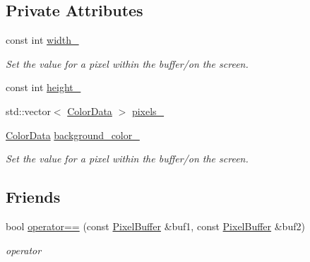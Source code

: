 \subsection*{Private Attributes}
\begin{DoxyCompactItemize}
\item 
const int \hyperlink{classimage__tools_1_1PixelBuffer_ac67206a6b428c7b33bd7f90f65b8c171}{width\+\_\+}
\begin{DoxyCompactList}\small\item\em Set the value for a pixel within the buffer/on the screen. \end{DoxyCompactList}\item 
const int \hyperlink{classimage__tools_1_1PixelBuffer_ae104466eae109324a4a0daa0bc14c980}{height\+\_\+}
\item 
std\+::vector$<$ \hyperlink{classimage__tools_1_1ColorData}{Color\+Data} $>$ \hyperlink{classimage__tools_1_1PixelBuffer_a0c52483e7e29f111acf98474105f2409}{pixels\+\_\+}
\item 
\hyperlink{classimage__tools_1_1ColorData}{Color\+Data} \hyperlink{classimage__tools_1_1PixelBuffer_a67c70e090217b58856633ff35d499de2}{background\+\_\+color\+\_\+}\hypertarget{classimage__tools_1_1PixelBuffer_a67c70e090217b58856633ff35d499de2}{}\label{classimage__tools_1_1PixelBuffer_a67c70e090217b58856633ff35d499de2}

\begin{DoxyCompactList}\small\item\em Set the value for a pixel within the buffer/on the screen. \end{DoxyCompactList}\end{DoxyCompactItemize}
\subsection*{Friends}
\begin{DoxyCompactItemize}
\item 
bool \hyperlink{classimage__tools_1_1PixelBuffer_a7feb7348c2478825d625c4feb141cfa4}{operator==} (const \hyperlink{classimage__tools_1_1PixelBuffer}{Pixel\+Buffer} \&buf1, const \hyperlink{classimage__tools_1_1PixelBuffer}{Pixel\+Buffer} \&buf2)\hypertarget{classimage__tools_1_1PixelBuffer_a7feb7348c2478825d625c4feb141cfa4}{}\label{classimage__tools_1_1PixelBuffer_a7feb7348c2478825d625c4feb141cfa4}

\begin{DoxyCompactList}\small\item\em operator \end{DoxyCompactList}\end{DoxyCompactItemize}


